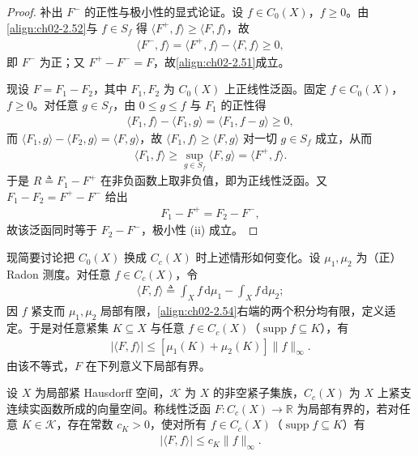 \documentclass[../../main.tex]{subfiles}%
\begin{document}
\begin{proof}
补出 $F^-$ 的正性与极小性的显式论证。设 $f\in C_0(X)$，$f\geqslant0$。由\eqref{align:ch02-2.52}与 $f\in S_f$ 得 $\langle F^+,f\rangle\geqslant\langle F,f\rangle$，故
\begin{align*}
\langle F^-,f\rangle=\langle F^+,f\rangle-\langle F,f\rangle\geqslant0,
\end{align*}
即 $F^-$ 为正；又 $F^+-F^-=F$，故\eqref{align:ch02-2.51}成立。

现设 $F=F_1-F_2$，其中 $F_1,F_2$ 为 $C_0(X)$ 上正线性泛函。固定 $f\in C_0(X)$，$f\geqslant0$。对任意 $g\in S_f$，由 $0\leqslant g\leqslant f$ 与 $F_1$ 的正性得
\begin{align*}
\langle F_1,f\rangle-\langle F_1,g\rangle=\langle F_1,f-g\rangle\geqslant0,
\end{align*}
而 $\langle F_1,g\rangle-\langle F_2,g\rangle=\langle F,g\rangle$，故 $\langle F_1,f\rangle\geqslant\langle F,g\rangle$ 对一切 $g\in S_f$ 成立，从而
\begin{align*}
\langle F_1,f\rangle\geqslant\sup_{g\in S_f}\langle F,g\rangle=\langle F^+,f\rangle.
\end{align*}
于是 $R\triangleq F_1-F^+$ 在非负函数上取非负值，即为正线性泛函。又 $F_1-F_2=F^+-F^-$ 给出
\begin{align*}
F_1-F^+=F_2-F^-,
\end{align*}
故该泛函同时等于 $F_2-F^-$，极小性 (ii) 成立。
\end{proof}

现简要讨论把 $C_0(X)$ 换成 $C_c(X)$ 时上述情形如何变化。设 $\mu_1,\mu_2$ 为（正）Radon 测度。对任意 $f\in C_c(X)$，令
\begin{align}
\langle F,f\rangle\triangleq \int_X f\,\mathrm{d}\mu_1-\int_X f\,\mathrm{d}\mu_2; \label{align:ch02-2.54}
\end{align}
因 $f$ 紧支而 $\mu_1,\mu_2$ 局部有限，\eqref{align:ch02-2.54}右端的两个积分均有限，定义适定。于是对任意紧集 $K\subseteq X$ 与任意 $f\in C_c(X)$（$\operatorname{supp}f\subseteq K$），有
\begin{align*}
|\langle F,f\rangle|\leqslant[\mu_1(K)+\mu_2(K)]\|f\|_\infty.
\end{align*}
由该不等式，$F$ 在下列意义下局部有界。

\begin{definition}[局部有界线性泛函]\label{definition:ch02-局部有界泛函}
设 $X$ 为局部紧 Hausdorff 空间，$\mathscr K$ 为 $X$ 的非空紧子集族，$C_c(X)$ 为 $X$ 上紧支连续实函数所成的向量空间。称线性泛函 $F:C_c(X)\to\mathbb R$ 为局部有界的，若对任意 $K\in\mathscr K$，存在常数 $c_K>0$，使对所有 $f\in C_c(X)$（$\operatorname{supp}f\subseteq K$）有
\begin{align*}
|\langle F,f\rangle|\leqslant c_K\|f\|_\infty.
\end{align*}
\end{definition}
\end{document}
